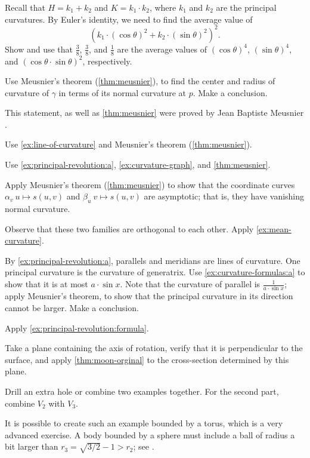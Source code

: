 Recall that $H=k_1+k_2$ and $K=k_1\cdot k_2$, where $k_1$ and $k_2$ are the principal curvatures.
By Euler's identity, we need to find the average value of 
\[(k_1\cdot (\cos\theta)^2+k_2\cdot (\sin\theta)^2)^2.\]
Show and use that $\tfrac38$, $\tfrac38$, and $\tfrac18$ are the average values of $(\cos\theta)^4$, $(\sin\theta)^4$, and $(\cos\theta\cdot \sin\theta)^2$, respectively.


Use Meusnier's theorem (\ref{thm:meusnier}), to find the center and radius of curvature of $\gamma$ in terms of its normal curvature at $p$.
Make a conclusion.

This statement, as well as \ref{thm:meusnier} were proved by Jean Baptiste Meusnier \cite{meusnier}.

Use \ref{ex:line-of-curvature} and Meusnier's theorem (\ref{thm:meusnier}).

Use \ref{ex:principal-revolution:a},  \ref{ex:curvature-graph}, and \ref{thm:meusnier}.

 Apply Meusnier's theorem (\ref{thm:meusnier}) to show that the coordinate curves $\alpha_v\:u\mapsto s(u,v)$ and $\beta_u\:v\mapsto s(u,v)$ are asymptotic; that is, they have vanishing normal curvature.

Observe that these two families are orthogonal to each other.
Apply \ref{ex:mean-curvature}.

By \ref{ex:principal-revolution:a}, parallels and meridians are lines of curvature.
One principal curvature is the curvature of generatrix.
Use \ref{ex:curvature-formulas:a} to show that it is at most $a\cdot \sin x$.
Note that the curvature of parallel is $\tfrac1{a\cdot \sin x}$;
apply Meusnier's theorem, to show that the principal curvature in its direction cannot be larger.
Make a conclusion.

 Apply \ref{ex:principal-revolution:formula}.

Take a plane containing the axis of rotation, verify that it is perpendicular to the surface, and apply \ref{thm:moon-orginal} to the cross-section determined by this plane.

Drill an extra hole or combine two examples together.
For the second part, combine $V_2$ with $V_3$.

It is possible to create such an example bounded by a torus, which is a very advanced exercise.
A body bounded by a sphere must include a ball of radius a bit larger than $r_3=\sqrt{3/2}-1>r_2$; see \cite{lagunov-1960, lagunov-1961, lagunov-fet-1963, lagunov-fet-1965}.

